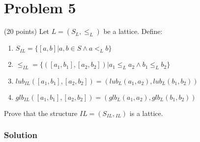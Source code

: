 \section*{Problem 5}
(20 points) Let $L = (S_L, \le_L)$ be a lattice. Define:
\begin{enumerate}
    \item $S_{IL} = \{ [a, b] | a, b \in S \wedge a <_L b \}$
    \item $\le_{IL} = \{ ([a_1, b_1], [a_2, b_2]) | a_1 \le_L a_2 \wedge b_1 \le_L b_2 \}$
    \item $lub_{IL}([a_1, b_1], [a_2, b_2]) = (lub_L(a_1, a_2), lub_L(b_1, b_2))$
    \item $glb_{IL}([a_1, b_1], [a_2, b_2]) = (glb_L(a_1, a_2), glb_L(b_1, b_2))$
\end{enumerate}
Prove that the structure $IL = (S_{IL}, {}_{IL})$ is a lattice.

\subsubsection*{Solution}

